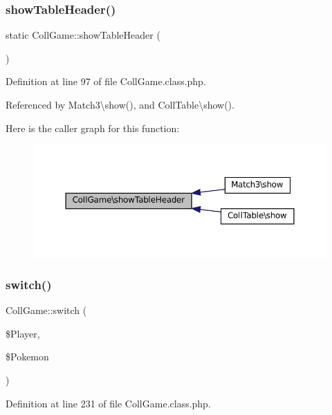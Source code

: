 \subsubsection{\texorpdfstring{show\+Table\+Header()}{showTableHeader()}}
{\footnotesize\ttfamily static Coll\+Game\+::show\+Table\+Header (\begin{DoxyParamCaption}{ }\end{DoxyParamCaption})\hspace{0.3cm}{\ttfamily [static]}}



Definition at line 97 of file Coll\+Game.\+class.\+php.



Referenced by Match3\textbackslash{}show(), and Coll\+Table\textbackslash{}show().

Here is the caller graph for this function\+:\nopagebreak
\begin{figure}[H]
\begin{center}
\leavevmode
\includegraphics[width=350pt]{class_coll_game_a91770bcb8218abf1e7dc0b48d2a0c2d5_icgraph}
\end{center}
\end{figure}
\mbox{\label{class_coll_game_aff51031bafd64d31e6799b9afd8ad340}} 
\subsubsection{\texorpdfstring{switch()}{switch()}}
{\footnotesize\ttfamily Coll\+Game\+::switch (\begin{DoxyParamCaption}\item[{}]{\$\+Player,  }\item[{}]{\$\+Pokemon }\end{DoxyParamCaption})}



Definition at line 231 of file Coll\+Game.\+class.\+php.



